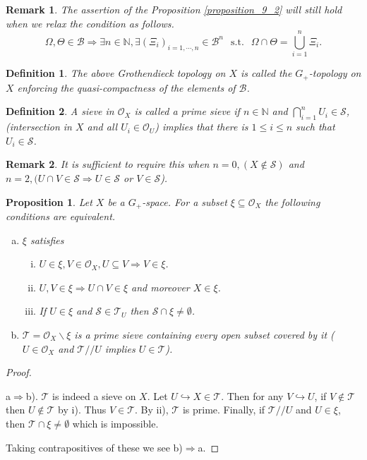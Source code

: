 \documentclass[8pt]{article}
\numberwithin{equation}{section}
\newtheorem{proposition}{Proposition}[subsection]
\newtheorem{definition}{Definition}[subsection]
\newtheorem{remark}{Remark}[subsection]
\DeclareMathOperator{\straw}{s.t.}
\newcommand{\Ouv}{\mathscr{O}}
\newcommand{\N}[0]{\mathbb{N}}
\newcommand{\st}[0]{\:\straw\:}
\newcommand{\sS}[0]{\mathscr{S}}
\newcommand{\sT}[0]{\mathscr{T}}
\newcommand{\cB}[0]{\mathcal{B}}
\begin{document}
\begin{remark}
    The assertion of the Proposition \ref{proposition_9_2} will still hold when we relax the condition as follows.
    \begin{equation*}
        \Omega,\Theta\in\cB\Rightarrow \exists n\in\N, \exists (\Xi_i)_{i=1,\cdots,n}\in\cB^n\:\st \: \Omega\cap\Theta = \bigcup_{i=1}^n \Xi_i.
    \end{equation*}
\end{remark}
\begin{definition}
    \label{definition_9_7}
    The above Grothendieck topology on $X$ is called the $G_+$-topology on $X$ enforcing the quasi-compactness of the elements of $\cB$.
\end{definition}
\begin{definition}
    \label{definition_9_8}
    A sieve in $\Ouv_X$ is called a prime sieve if $n\in\N$ and $\bigcap_{i=1}^nU_i\in\sS$, (intersection in $X$ and all $U_i\in\Ouv_U$) implies that there is $1\leq i\leq n$ such that $U_i\in\sS$.
\end{definition}
\begin{remark}
    It is sufficient to require this when $n=0,(X\not\in\sS)$ and $n=2,(U\cap V\in\sS\Rightarrow U\in\sS$ or $V\in\sS$).
\end{remark}
\begin{proposition}
    \label{proposition_9_3}
    Let $X$ be a $G_+$-space. For a subset $\xi\subseteq\Ouv_X$ the following conditions are equivalent.
    \begin{enumerate}[a.]
        \item $\xi$ satisfies 
            \begin{enumerate}[i.]
                \item $U\in\xi,V\in\Ouv_X,U\subseteq V\Rightarrow V\in\xi$.
                \item $U,V\in\xi\Rightarrow U\cap V\in\xi$ and moreover $X\in\xi$.
                \item If $U\in\xi$ and $\sS\in\mathcal{T}_U$ then $\sS\cap\xi\not=\emptyset$.
            \end{enumerate}
        \item $\mathscr{T}=\Ouv_X\backslash\xi$ is a prime sieve containing every open subset covered by it ($U\in\Ouv_X$ and $\mathscr{T}//U$ implies $U\in\mathscr{T}$).
    \end{enumerate}
\end{proposition}
\begin{proof}$\:$
    \par a$\Rightarrow$b). $\sT$ is indeed a sieve on $X$. Let $U\hookrightarrow X\in \sT$. Then for any $V\hookrightarrow U$, if $V\not\in \sT$ then $U\not\in\sT$ by i). Thus $V\in\sT$. 
    By ii), $\sT$ is prime. Finally, if $\sT// U$ and $U\in\xi$, then $\sT\cap\xi\not=\emptyset$ which is impossible. 
    \par Taking contrapositives of these we see b)$\Rightarrow$a.
\end{proof}
\end{document}
